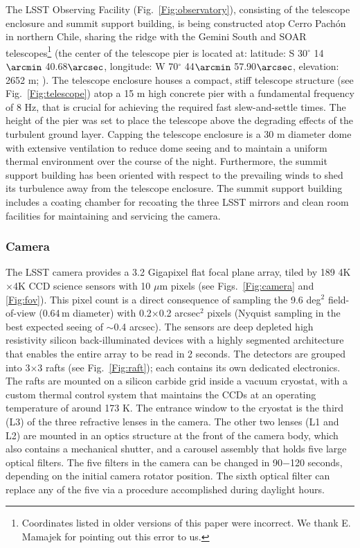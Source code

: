 The LSST Observing Facility (Fig.~\ref{Fig:observatory}),
consisting of the telescope enclosure and summit support building, is being constructed atop Cerro Pach\'{o}n in northern Chile,
sharing the ridge with the Gemini South and SOAR telescopes\footnote{Coordinates listed in older versions
of this paper were incorrect. We thank E. Mamajek for pointing out this error to us.}
(the center of the telescope pier is located at: latitude: S 30$^\circ$ 14$\arcmin$ 40.68$\arcsec$, 
longitude: W 70$^\circ$ 44$\arcmin$ 57.90$\arcsec$, elevation: 2652 m;
\citealt{2012arXiv1210.1616M}).  The telescope enclosure houses a compact, stiff
telescope structure (see Fig.~\ref{Fig:telescope}) atop a 15 m high concrete pier
with a fundamental frequency of 8 Hz, that is crucial for achieving the required fast slew-and-settle times.  The height of the pier was set to place the telescope above the degrading
effects of the turbulent ground layer.  Capping the telescope
enclosure is a 30 m diameter dome with extensive ventilation to reduce
dome seeing
and to maintain a uniform thermal environment over the course of the night.  Furthermore, the summit support
building has been oriented with respect to the prevailing winds to shed its turbulence away from the
telescope enclosure.  The summit support building includes a coating chamber for recoating the three LSST mirrors and
clean room facilities for maintaining and servicing the camera.


\subsubsection{ Camera }


The LSST camera provides a 3.2 Gigapixel flat focal plane array, tiled by 189
4K$\times$4K CCD science sensors with 10 $\mu$m pixels (see Figs.~\ref{Fig:camera}
and \ref{Fig:fov}). This pixel count is a direct consequence of sampling the
9.6 deg$^2$ field-of-view (0.64\,m diameter) with 0.2$\times$0.2 arcsec$^2$
pixels (Nyquist sampling in the best expected seeing of $\sim$0.4 arcsec).
The sensors are deep depleted high resistivity silicon back-illuminated devices with
a highly segmented architecture that enables the entire array to be read in 2 seconds.
The detectors are grouped into 3$\times$3 rafts (see Fig.~\ref{Fig:raft}); each
contains its own dedicated electronics. The rafts are mounted on a silicon carbide
grid inside a vacuum cryostat, with a custom thermal control system that maintains
the CCDs at an operating temperature of around 173 K. The entrance window to the
cryostat is the third (L3) of the three refractive lenses in the camera. The other
two lenses (L1 and L2) are mounted in an optics structure at the front of the camera
body, which also contains a mechanical shutter, and a carousel assembly that holds
five large optical filters. The five filters in the camera can be changed in 90$-$120 seconds, 
depending on the initial camera rotator position. The sixth optical filter can
replace any of the five via a procedure accomplished during daylight hours.


